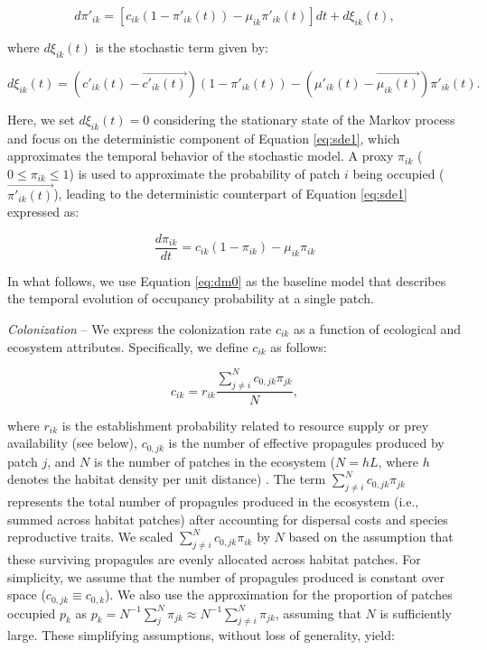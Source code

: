 \documentclass[11pt, class=article, crop=false]{standalone}
\begin{document}
\begin{equation}
    d \pi'_{ik} = [c_{ik} (1 - \pi'_{ik}(t)) - \mu_{ik} \pi'_{ik}(t)]dt + d\xi_{ik}(t),
    \label{eq:sde1}
\end{equation}

where $d\xi_{ik}(t)$ is the stochastic term given by:

\begin{equation}
    d\xi_{ik}(t) = (c'_{ik}(t) - \overrightarrow{c'_{ik}(t)}) (1 - \pi'_{ik}(t)) - (\mu'_{ik}(t) - \overrightarrow{\mu_{ik}(t)}) \pi'_{ik}(t).
\end{equation}

Here, we set $d\xi_{ik}(t) = 0$ considering the stationary state of the Markov process and focus on the deterministic component of Equation \ref{eq:sde1}, which approximates the temporal behavior of the stochastic model.
A proxy $\pi_{ik}$ ($0 \le \pi_{ik} \le 1$) is used to approximate the probability of patch $i$ being occupied ($\overrightarrow{\pi'_{ik}(t)}$), leading to the deterministic counterpart of Equation \ref{eq:sde1} expressed as:

\begin{equation}
    \frac{d \pi_{ik}}{d t} = c_{ik} (1 - \pi_{ik}) - \mu_{ik} \pi_{ik}
    \label{eq:dm0}
\end{equation}

In what follows, we use Equation \ref{eq:dm0} as the baseline model that describes the temporal evolution of occupancy probability at a single patch.

\textit{Colonization} --
We express the colonization rate $c_{ik}$ as a function of ecological and ecosystem attributes.
Specifically, we define $c_{ik}$ as follows:

\begin{equation}
    c_{ik} = r_{ik} \frac{\sum_{j \ne i}^N c_{0, jk} \pi_{jk}}{N},
    \label{eq:clnz}
\end{equation}

where $r_{ik}$ is the establishment probability related to resource supply or prey availability (see below), $c_{0, jk}$ is the number of effective propagules produced by patch $j$, and $N$ is the number of patches in the ecosystem ($N = hL$, where $h$ denotes the habitat density per unit distance) .
The term $\sum_{j \ne i}^N c_{0, jk} \pi_{jk}$ represents the total number of propagules produced in the ecosystem (i.e., summed across habitat patches) after accounting for dispersal costs and species reproductive traits.
We scaled $\sum_{j \ne i}^N c_{0, jk} \pi_{ik}$ by $N$ based on the assumption that these surviving propagules are evenly allocated across habitat patches.
For simplicity, we assume that the number of propagules produced is constant over space ($c_{0, jk} \equiv c_{0, k}$).
We also use the approximation for the proportion of patches occupied $p_k$ as $p_k = N^{-1}\sum_{j}^N \pi_{jk} \approx N^{-1}\sum_{j \ne i}^N \pi_{jk}$, assuming that $N$ is sufficiently large.
These simplifying assumptions, without loss of generality, yield:
\end{document}
